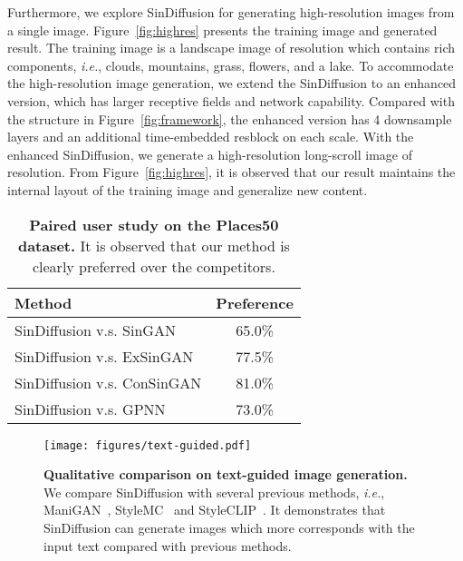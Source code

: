 \documentclass[10pt,twocolumn,letterpaper]{article}
\begin{document}
Furthermore, we explore SinDiffusion for generating high-resolution images from a single image.
Figure~\ref{fig:highres} presents the training image and generated result.
The training image is a landscape image of  resolution which contains rich components, \emph{i.e.}, clouds, mountains, grass, flowers, and a lake.
To accommodate the high-resolution image generation, we extend the SinDiffusion to an enhanced version, which has larger receptive fields and network capability.
Compared with the structure in Figure~\ref{fig:framework}, the enhanced version has 4 downsample layers and an additional time-embedded resblock on each scale.
With the enhanced SinDiffusion, we generate a high-resolution long-scroll image of  resolution.
From Figure~\ref{fig:highres}, it is observed that our result maintains the internal layout of the training image and generalize new content.

\begin{table}[t]
    \footnotesize
    \centering
    \begin{tabular}{l @{\hskip 30mm} c}
    \toprule
    \textbf{Method} & \textbf{Preference} \\
    \midrule
    {SinDiffusion v.s. SinGAN} & 65.0\% \\
    {SinDiffusion v.s. ExSinGAN} & 77.5\% \\
    {SinDiffusion v.s. ConSinGAN} & 81.0\% \\
    {SinDiffusion v.s. GPNN} & 73.0\% \\
    \bottomrule
    \end{tabular}
    \vspace{-3mm}
    \caption{\textbf{Paired user study on the Places50 dataset.}
    It is observed that our method is clearly preferred over the competitors.}
    \vspace{-6mm}
    \label{tab:userstudy}
\end{table}


\begin{figure*}[t]
  \centering
   \texttt{[image: figures/text-guided.pdf]}
   \vspace{-7mm}
   \caption{
   \textbf{Qualitative comparison on text-guided image generation.}
   We compare SinDiffusion with several previous methods, \emph{i.e.}, ManiGAN~\cite{li2020manigan}, StyleMC~\cite{kocasari2022stylemc} and StyleCLIP~\cite{patashnik2021styleclip}.
   It demonstrates that SinDiffusion can generate images which more corresponds with the input text compared with previous methods.
   }
   \vspace{-5mm}
   \label{fig:text-guided}
\end{figure*}
\end{document}
